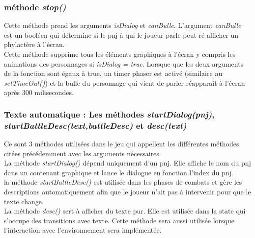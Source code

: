 \documentclass[11pt]{article}
\begin{document}
\begin{appendices}
\subsubsection{méthode \textit{stop()}}
Cette méthode prend les arguments \textit{isDialog} et \textit{canBulle}. L'argument \textit{canBulle} est un booléen qui détermine si le pnj à qui le joueur parle peut ré-afficher un phylactère à l'écran.\\

Cette méthode supprime tous les éléments graphiques à l'écran y compris les animations des personnages si \textit{isDialog = true}.  Lorsque que les deux arguments de la fonction sont égaux à true, un timer phaser est activé (similaire au \textit{setTimeOut()}) et la bulle du personnage qui vient de parler réapparaît à l'écran après 300 milisecondes. 

\subsubsection{Texte automatique : Les méthodes \textit{startDialog(pnj)}, \textit{startBattleDesc(text,battleDesc)} et \textit{desc(text)}}
Ce sont 3 méthodes utilisées dans le jeu qui appellent les différentes méthodes citées précédemment avec les arguments nécessaires. \\

La méthode \textit{startDialog()} dépend uniquement d'un pnj. Elle affiche le nom du pnj dans un contenant graphique et lance le dialogue en fonction l'index du pnj. \\

la méthode \textit{startBattleDesc()} est utilisée dans les phases de combats et gère les descriptions automatiquement afin que le joueur n'ait pas à intervenir pour que le texte change. \\

La méthode \textit{desc()} sert à afficher du texte pur.  Elle est utilisée dans la state qui s'occupe des transitions avec texte. Cette méthode sera aussi utilisée lorsque l'interaction avec l'environnement sera implémentée.\\



\end{appendices}
\end{document}
